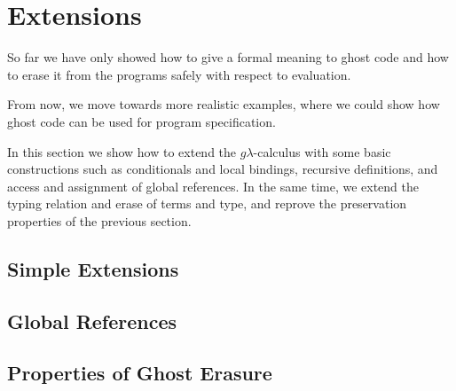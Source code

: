 \newpage
\section{Extensions}

So far we have only showed how to give a formal meaning to ghost code and
how to erase it from the programs safely with respect to evaluation.

From now, we move towards more realistic examples, where we could show how
ghost code can be used for program specification.

In this section we show how to extend the $g\lambda$-calculus with
 some basic constructions such as conditionals and local bindings, recursive definitions, and access and assignment of global references. In the same time, we extend the typing relation and erase of terms and type, and  reprove the preservation properties of the previous section.
 
 \subsection{Simple Extensions}
 \subsection{Global References}
 \subsection{Properties of Ghost Erasure}
 
 

